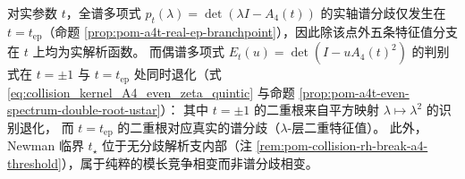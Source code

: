 \begin{conclusion}\label{con:pom-a4t-branching-layered-structure}
对实参数 \(t\)，全谱多项式 \(p_t(\lambda)=\det(\lambda I-A_4(t))\) 的实轴谱分歧仅发生在 \(t=t_{\mathrm{ep}}\)（命题 \ref{prop:pom-a4t-real-ep-branchpoint}），因此除该点外五条特征值分支在 \(t\) 上均为实解析函数。
而偶谱多项式 \(E_t(u)=\det(I-uA_4(t)^2)\) 的判别式在 \(t=\pm1\) 与 \(t=t_{\mathrm{ep}}\) 处同时退化（式 \eqref{eq:collision_kernel_A4_even_zeta_quintic} 与命题 \ref{prop:pom-a4t-even-spectrum-double-root-ustar}）：
其中 \(t=\pm1\) 的二重根来自平方映射 \(\lambda\mapsto \lambda^2\) 的识别退化，
而 \(t=t_{\mathrm{ep}}\) 的二重根对应真实的谱分歧（\(\lambda\)-层二重特征值）。
此外，Newman 临界 \(t_\star\) 位于无分歧解析支内部（注 \ref{rem:pom-collision-rh-break-a4-threshold}），属于纯粹的模长竞争相变而非谱分歧相变。
\end{conclusion}

